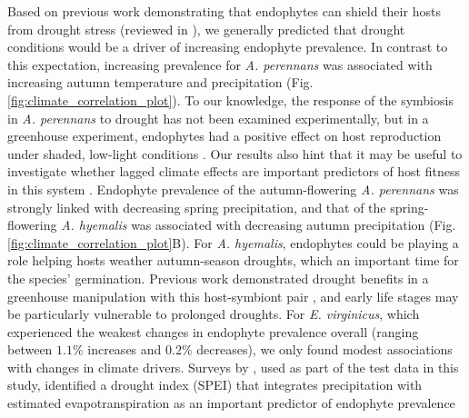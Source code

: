 \documentclass[11pt]{article}
\let\cite\citep
\newcommand{\firstrevise}[1]{{\color{black}{#1}}}
\begin{document}
Based on previous work demonstrating that endophytes can shield their hosts from drought stress (reviewed in \citet{decunta2021systematic}), we generally predicted that drought conditions would be a driver of increasing endophyte prevalence. 
In contrast to this expectation, increasing prevalence for \emph{A. perennans} was associated with \firstrevise{both} increasing autumn temperature and precipitation (Fig. \ref{fig:climate_correlation_plot}). 
To our knowledge, the response of the symbiosis in \emph{A. perennans} to drought has not been examined experimentally, but in a greenhouse experiment, endophytes had a positive effect on host reproduction under shaded, low-light conditions \citep{davitt2010costs}. 
Our results also hint that it may be useful to investigate whether lagged climate effects are important predictors of host fitness in this system \cite{evers2021lagged}.
Endophyte prevalence of the autumn-flowering \emph{A. perennans} was strongly linked with decreasing spring precipitation, and that of the spring-flowering \emph{A. hyemalis} was associated with decreasing autumn precipitation (Fig. \ref{fig:climate_correlation_plot}B). 
For \emph{A. hyemalis}, endophytes could be playing a role helping hosts weather autumn-season droughts, which \firstrevise{is likely also} an important time for the species' germination.
Previous work demonstrated drought benefits in a greenhouse manipulation with this host-symbiont pair \citep{davitt2011understanding}, and early life stages may be particularly vulnerable to prolonged droughts.
For \emph{E. virginicus}, which experienced the weakest changes in endophyte prevalence overall (ranging between $1.1$\% increases and $0.2$\% decreases), we only found modest associations with changes in climate drivers. 
Surveys by \citet{sneck2017variation}, used as part of the test data in this study, identified a drought index (SPEI) that integrates precipitation with estimated evapotranspiration as an important predictor of \firstrevise{contemporary} endophyte prevalence \linelabel{R2C14-begin}\firstrevise{in this species.
The diverse relationships we detect between trends in endophyte prevalence and climate drivers suggest a more complicated picture than the simple explanation that drought alone, as measured through changes in annual precipitation, causes increasing endophyte prevalence through context-dependent fitness benefits.}
\end{document}
